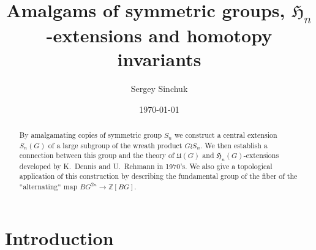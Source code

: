 \documentclass[oneside, 12pt]{amsart}
\title{Amalgams of symmetric groups, $\mathfrak{H}_n$-extensions and homotopy invariants}
\author {Sergey Sinchuk}
\date {\today}
\theoremstyle{plain}
\numberwithin{equation}{section}
\numberwithin{lemma}{section}
\theoremstyle{remark}
\theoremstyle{definition}
\DeclareMathOperator{\colim}{colim}
\begin{document}
\begin{abstract} By amalgamating copies of symmetric group $S_n$ we construct a central extension $S_n(G)$ of a large subgroup of the wreath product $G \wr S_n$.
We then establish a connection between this group and the theory of $\mathfrak{U}(G)$ and $\mathfrak{H}_n(G)$-extensions developed by K.~Dennis and U.~Rehmann in 1970's.
We also give a topological application of this construction by describing the fundamental group of the fiber of the ``alternating`` map $BG^{2n}\to \mathbb{Z}[BG]$.
\end{abstract}

\maketitle

\section{Introduction}
\begin{comment}
Let $G$ be a group. In~\cite{De76} K.~Dennis defined certain central extension $(G, G)$ of the derived subgroup $[G, G]$ 
 (see section~\ref{ssec:extensions} below for the definition).
This extension is a quotient of the nonabelian tensor square $G \otimes G$ (but is itself an extension of $\bigwedge^2G$) such that the kernel of the natural map $(G, G) \to [G, G]$ 
 is Dennis functor $\widetilde{H}_2(G, \mathbb{Z})$.
Under the notation $U(G)$ the same extension appears in U.~Rehmann's paper~\cite{Reh78}, where it is used to formulate the noncommutative version of Matsumoto theorem.
Recall that this theorem asserts for a skew-field $D$ that the group $K_2(D)$ is precisely the quotient of $\widetilde{H}_2(D^*, \mathbb{Z})$ modulo Steinberg relations $\{u, 1-u\} = 1$, $u\in D^*$.

The aim of this note is to describe yet another situation in which the groups $(G, G)$ and $\Lambda^2(G)$ make an appearance.

{\bf TODO: Mention new simpler presentation of Rehmann's extensions for $n\geq 4$}


Unsurprisingly, the main motivation for the definition of the group $S_n(G)$ comes from algebraic topology.
More specifically, our initial question was to describe the fiber of the ''alternating map`` $X^{2n} \to \mathbb{Z}[X]$ in the special case $X=BG$.
\end{comment}
\end{document}
